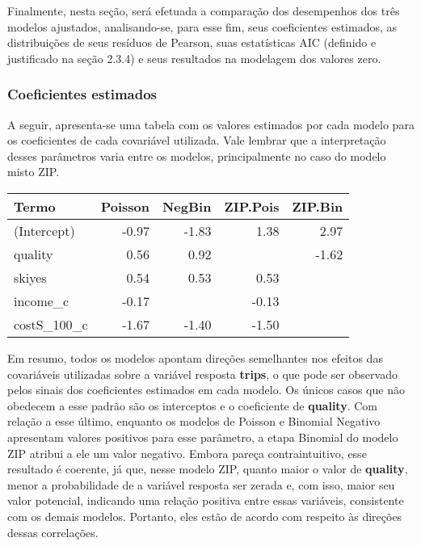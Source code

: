 \documentclass[
  twocolumn]{article}
\begin{document}
Finalmente, nesta seção, será efetuada a comparação dos desempenhos dos
três modelos ajustados, analisando-se, para esse fim, seus coeficientes
estimados, as distribuições de seus resíduos de Pearson, suas
estatísticas AIC (definido e justificado na seção 2.3.4) e seus
resultados na modelagem dos valores zero.

\subsubsection{Coeficientes estimados}\label{coeficientes-estimados}

A seguir, apresenta-se uma tabela com os valores estimados por cada
modelo para os coeficientes de cada covariável utilizada. Vale lembrar
que a interpretação desses parâmetros varia entre os modelos,
principalmente no caso do modelo misto ZIP.

\begin{center}
\footnotesize
\begin{tabular}{lrrrr}
  \hline
Termo & Poisson & NegBin & ZIP.Pois & ZIP.Bin \\ 
  \hline
(Intercept) & -0.97 & -1.83 & 1.38 & 2.97 \\ 
  quality & 0.56 & 0.92 &  & -1.62 \\ 
  skiyes & 0.54 & 0.53 & 0.53 &  \\ 
  income\_c & -0.17 &  & -0.13 &  \\ 
  costS\_100\_c & -1.67 & -1.40 & -1.50 &  \\ 
   \hline
\end{tabular}\end{center}
\normalsize

Em resumo, todos os modelos apontam direções semelhantes nos efeitos das
covariáveis utilizadas sobre a variável resposta \textbf{trips}, o que
pode ser observado pelos sinais dos coeficientes estimados em cada
modelo. Os únicos casos que não obedecem a esse padrão são os
interceptos e o coeficiente de \textbf{quality}. Com relação a esse
último, enquanto os modelos de Poisson e Binomial Negativo apresentam
valores positivos para esse parâmetro, a etapa Binomial do modelo ZIP
atribui a ele um valor negativo. Embora pareça contraintuitivo, esse
resultado é coerente, já que, nesse modelo ZIP, quanto maior o valor de
\textbf{quality}, menor a probabilidade de a variável resposta ser
zerada e, com isso, maior seu valor potencial, indicando uma relação
positiva entre essas variáveis, consistente com os demais modelos.
Portanto, eles estão de acordo com respeito às direções dessas
correlações.
\end{document}
